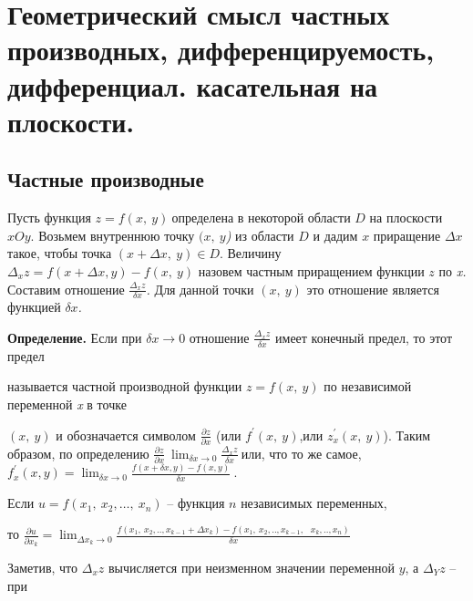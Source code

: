 \section{Геометрический смысл частных
производных, дифференцируемость, дифференциал. касательная на
плоскости.}

\hypertarget{ux447ux430ux441ux442ux43dux44bux435-ux43fux440ux43eux438ux437ux432ux43eux434ux43dux44bux435}{%
\subsection{\texorpdfstring{\textbf{Частные производные}
}{Частные производные }}\label{ux447ux430ux441ux442ux43dux44bux435-ux43fux440ux43eux438ux437ux432ux43eux434ux43dux44bux435}}

Пусть функция $z = f(x,\ y)\ $определена в некоторой области $D$ на
плоскости $xOy$. Возьмем внутреннюю точку $(x,\ y$\emph{)} из
области $D$ и дадим $x$ приращение $\Delta x$ такое, чтобы точка
$\left( x + \Delta x,\ y \right) \in D$. Величину
$\Delta_{x}z = f\left( x + \Delta x,y \right) - f(x,\ y)$ назовем
частным приращением функции $z$ по \emph{x.} Составим отношение
$\frac{\Delta_{x}z}{\delta x}$\emph{.} Для данной точки $(x,\ y)$
это отношение является функцией $\delta x$\emph{.}

\textbf{Определение.} Если при $\delta x \rightarrow 0$ отношение
$\frac{\Delta_{x}z}{\delta x}$ имеет конечный предел, то этот предел

называется частной производной функции $z = f(x,\ y)$ по независимой
переменной \emph{x} в точке

$(x,\ y)$ и обозначается символом $\frac{\partial z}{\partial x}$
(или $f^{'}(x,\ y)$,или $z_{x}^{'}(x,\ y)$). Таким образом, по
определению
$\frac{\partial z}{\partial x}\ \lim_{\delta x \rightarrow 0}\frac{\Delta_{x}z}{\delta x}\ $или,
что то же самое,
$f_{x}^{'}\left( x,y \right) = \lim_{\delta x \rightarrow 0}\frac{f\left( x + \delta x,y \right) - f\left( x,y \right)}{\delta x}\ $.

Если $u = f(x_{1},\ x_{2},\ldots,\ x_{n})$ -- функция $n$
независимых переменных,

то
$\frac{\partial u}{\partial x_{k}} = \lim_{\Delta x_{k} \rightarrow 0}\frac{f\left( x_{1},\ x_{2},..,x_{k - 1} + \Delta x_{k} \right) - f\left( x_{1},\ x_{2},..,x_{k - 1},\ \ \ x_{k},..,x_{n} \right)}{\delta x}$

Заметив, что $\Delta_{x}z$ вычисляется при неизменном значении
переменной $y$, а $\Delta_{Y}z$ -- при

